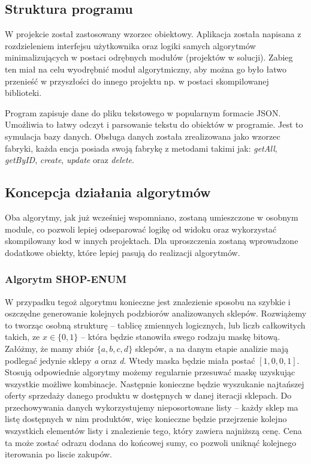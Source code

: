 \documentclass[a4paper]{article}
\begin{document}
\subsection{Struktura programu}
W projekcie został zastosowany wzorzec obiektowy. Aplikacja została napisana z rozdzieleniem interfejsu użytkownika oraz logiki samych algorytmów minimalizujących w postaci odrębnych modułów (projektów w solucji). Zabieg ten miał na celu wyodrębnić moduł algorytmiczny, aby można go było łatwo przenieść w przyszłości do innego projektu np. w postaci skompilowanej biblioteki.
\begin{flushleft}
Program zapisuje dane do pliku tekstowego w popularnym formacie JSON. Umożliwia to łatwy odczyt i parsowanie tekstu do obiektów w programie. Jest to symulacja bazy danych. Obsługa danych została zrealizowana jako wzorzec fabryki, każda encja posiada swoją fabrykę z metodami takimi jak: \textit{getAll}, \textit{getByID}, \textit{create}, \textit{update} oraz \textit{delete}.
\end{flushleft}
\subsection{Koncepcja działania algorytmów}
Oba algorytmy, jak już wcześniej wspomniano, zostaną umieszczone w osobnym module, co pozwoli lepiej odseparować logikę od widoku oraz wykorzystać skompilowany kod w innych projektach. Dla uproszczenia zostaną wprowadzone dodatkowe obiekty, które lepiej pasują do realizacji algorytmów. 
\subsubsection{Algorytm SHOP-ENUM}
W przypadku tegoż algorytmu konieczne jest znalezienie sposobu na szybkie i oszczędne generowanie kolejnych podzbiorów analizowanych sklepów. Rozwiążemy to tworząc osobną strukturę – tablicę zmiennych logicznych, lub liczb całkowitych takich, ze $x \in \{0, 1\}$ – która będzie stanowiła swego rodzaju maskę bitową. Załóżmy, że  mamy zbiór $\{a, b, c, d\}$ sklepów, a na danym etapie analizie mają podlegać jedynie sklepy \textit{a} oraz \textit{d}. Wtedy maska będzie miała postać $[1, 0, 0, 1]$. Stosują odpowiednie algorytmy możemy regularnie przesuwać maskę uzyskując wszystkie możliwe kombinacje. Następnie konieczne będzie wyszukanie najtańszej oferty sprzedaży danego produktu w dostępnych w danej iteracji sklepach. Do przechowywania danych wykorzystujemy nieposortowane listy – każdy sklep ma listę dostępnych w nim produktów, więc konieczne będzie przejrzenie kolejno wszystkich elementów listy i znalezienie tego, który zawiera najniższą cenę. Cena ta może zostać odrazu dodana do końcowej sumy, co pozwoli uniknąć kolejnego iterowania po liscie zakupów.
\end{document}
